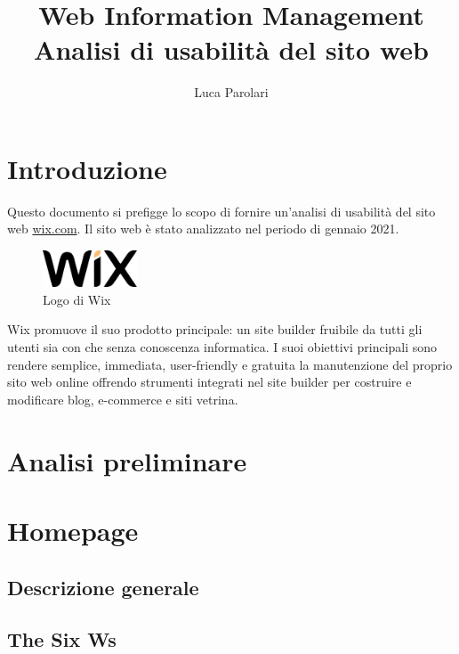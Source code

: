\documentclass[11pt,a4paper]{article}
\author{Luca Parolari}
\title{Web Information Management\\ \large Analisi di usabilità del sito web \wixcom{}}
\newcommand*{\wix}{Wix}
\newcommand*{\wixcom}{wix.com}
\begin{document}
\maketitle

\clearpage
\tableofcontents

\clearpage

\section{Introduzione}
\label{sec:intro}

Questo documento si prefigge lo scopo di fornire un'analisi di
usabilità del sito web \href{https://wix.com}{\wixcom{}}. Il sito web è
stato analizzato nel periodo di gennaio 2021.

\begin{figure}[h]
  \centering
  \includegraphics[width=0.25\textwidth]{wix-logo}
  \caption{Logo di \wix{}}
  \label{fix:wix-logo}
\end{figure}

\wix{} promuove il suo prodotto principale: un site builder fruibile da
tutti gli utenti sia con che senza conoscenza informatica. I suoi
obiettivi principali sono rendere semplice, immediata, user-friendly e
gratuita la manutenzione del proprio sito web online offrendo
strumenti integrati nel site builder per costruire e modificare blog,
e-commerce e siti vetrina.

\section{Analisi preliminare}
\label{sec:preliminary-analysis}

\section{Homepage}
\label{sec:homepage-analysis}

\subsection{Descrizione generale}
\label{subsec:homepage-description}

\subsection{The Six Ws}
\label{subsec:homepage-the-six-ws}
\end{document}
